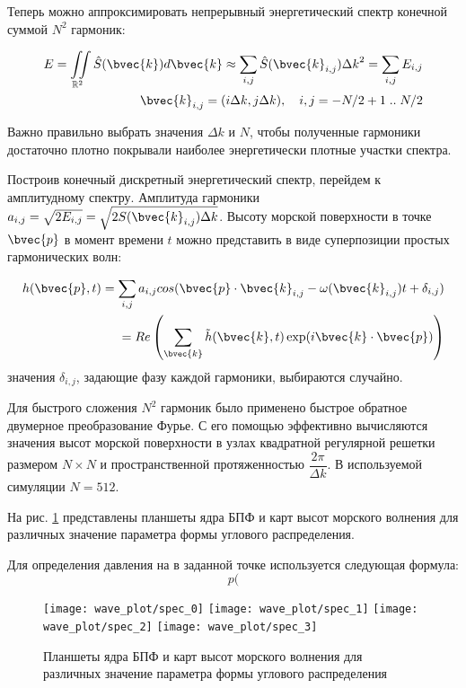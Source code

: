 Теперь можно аппроксимировать непрерывный энергетический спектр конечной суммой $N^2$ гармоник:

\begin{equation}
\begin{split}
E = \iint\limits_{\mathbb{R}^2} \hat{S}(\bvec{k})d\bvec{k}
    \approx \sum_{i,j} \hat{S}(\bvec{k}_{i,j}) {\Delta k}^2 
    = \sum_{i,j} E_{i,j}\\
\bvec{k}_{i,j} = (i\Delta k, j\Delta k), \quad i,j = -N/2+1 \; .. \; N/2 
\end{split}
\end{equation}

Важно правильно выбрать значения $\Delta k$ и $N$, чтобы полученные гармоники достаточно плотно покрывали наиболее энергетически плотные участки спектра.

Построив конечный дискретный энергетический спектр, перейдем к амплитудному спектру. Амплитуда гармоники $a_{i,j} = \sqrt{2E_{i,j}} = \sqrt{2S(\bvec{k}_{i,j})\Delta k}$. Высоту морской поверхности в точке $\bvec{p}$ в момент времени $t$ можно представить в виде суперпозиции простых гармонических волн:

\begin{equation}
\label{wave_height}
\begin{split}
h(\bvec{p}, t) = \sum_{i,j} a_{i,j}cos(\bvec{p}\cdot \bvec{k}_{i,j} - \omega(\bvec{k}_{i,j})t + \delta_{i,j}) \\
= Re\left( \sum_{\bvec{k}} \tilde{h}(\bvec{k}, t)
 \exp(i\bvec{k} \cdot \bvec{p}) \right)
\end{split}
\end{equation}
значения $\delta_{i,j}$, задающие фазу каждой гармоники, выбираются случайно.

Для быстрого сложения $N^2$ гармоник было применено быстрое обратное двумерное преобразование Фурье. С его помощью эффективно вычисляются значения высот морской поверхности в узлах квадратной регулярной решетки размером $N \times N$ и пространственной протяженностью $\dfrac{2\pi}{\Delta k}$. В используемой симуляции $N = 512$.

На рис. \ref{waveplot} представлены планшеты ядра БПФ и карт высот морского волнения для различных значение параметра формы углового распределения.

Для определения давления на в заданной точке используется следующая формула:
\begin{equation}
\label{wave_height}
	p(
\end{equation}

\begin{figure}[ht]
\begin{center}
	\texttt{[image: wave\_plot/spec\_0]}
	\texttt{[image: wave\_plot/spec\_1]}
	\texttt{[image: wave\_plot/spec\_2]}
	\texttt{[image: wave\_plot/spec\_3]}
\end{center}
\caption{Планшеты ядра БПФ и карт высот морского волнения для различных значение параметра формы углового распределения}
\label{waveplot}
\end{figure}

